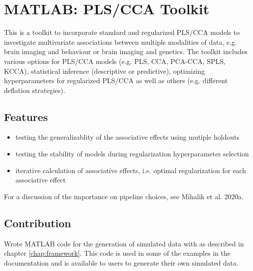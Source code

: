 \section{MATLAB: PLS/CCA Toolkit}

This is a toolkit to incorporate standard and regularized PLS/CCA models to investigate multivariate associations between multiple modalities of data, e.g. brain imaging and behaviour or brain imaging and genetics. The toolkit includes various options for PLS/CCA models (e.g. PLS, CCA, PCA-CCA, SPLS, KCCA), statistical inference (descriptive or predictive), optimizing hyperparameters for regularized PLS/CCA as well as others (e.g. different deflation strategies).

\subsection{Features}

\begin{itemize}
    \item testing the generalizablity of the associative effects using mutiple holdouts
    \item testing the stability of models during regularization hyperparameter selection
    \item iterative calculation of associative effects, i.e. optimal regularization for each associative effect
\end{itemize}

For a discussion of the importance on pipeline choices, see Mihalik et al. 2020a.

\subsection{Contribution}

Wrote MATLAB code for the generation of simulated data with as described in chapter \ref{chap:framework}. This code is used in some of the examples in the documentation and is available to users to generate their own simulated data.

